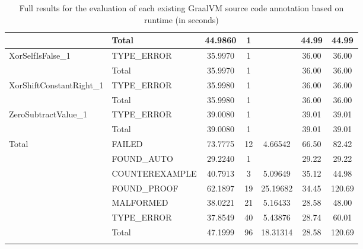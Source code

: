 \begin{appendices}
\begin{longtable}{L{0.25\textwidth} L{0.2\textwidth}  c  c  c  c  c }
    & Total & 44.9860 & 1 &  & 44.99 & 44.99 \\ \midrule 
    XorSelfIsFalse\_1 & TYPE\_ERROR & 35.9970 & 1 &  & 36.00 & 36.00 \\ \midrule 
    & Total & 35.9970 & 1 &  & 36.00 & 36.00 \\ \midrule 
    XorShiftConstantRight\_1 & TYPE\_ERROR & 35.9980 & 1 &  & 36.00 & 36.00 \\ \midrule 
    & Total & 35.9980 & 1 &  & 36.00 & 36.00 \\ \midrule 
    ZeroSubtractValue\_1 & TYPE\_ERROR & 39.0080 & 1 &  & 39.01 & 39.01 \\ \midrule 
    & Total & 39.0080 & 1 &  & 39.01 & 39.01 \\ \midrule 
    Total & FAILED & 73.7775 & 12 & 4.66542 & 66.50 & 82.42 \\ \midrule 
    & FOUND\_AUTO & 29.2240 & 1 &  & 29.22 & 29.22 \\ \midrule 
    & COUNTEREXAMPLE & 40.7913 & 3 & 5.09649 & 35.12 & 44.98 \\ \midrule 
    & FOUND\_PROOF & 62.1897 & 19 & 25.19682 & 34.45 & 120.69 \\ \midrule 
    & MALFORMED & 38.0221 & 21 & 5.16433 & 28.58 & 48.00 \\ \midrule 
    & TYPE\_ERROR & 37.8549 & 40 & 5.43876 & 28.74 & 60.01 \\ \midrule 
    & Total & 47.1999 & 96 & 18.31314 & 28.58 & 120.69 \\ \bottomrule 

    \caption{Full results for the evaluation of each existing GraalVM source code annotation based on runtime (in seconds)} %
    \label{tab:fullEvaluationVeriopt}
\end{longtable}

\end{appendices}